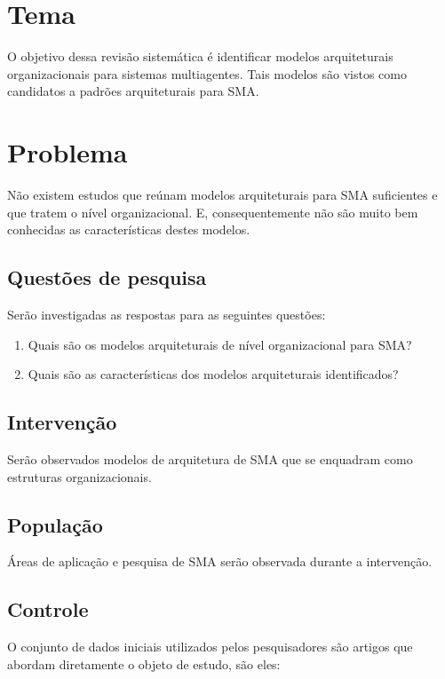 
\section{Tema}

O objetivo dessa revisão sistemática é identificar modelos arquiteturais organizacionais para sistemas multiagentes. Tais modelos são vistos como candidatos a padrões arquiteturais para SMA.

\section{Problema}

Não existem estudos que reúnam modelos arquiteturais para SMA suficientes e que tratem o nível organizacional. E, consequentemente não são muito bem conhecidas as características destes modelos.

\subsection{Questões de pesquisa}

Serão investigadas as respostas para as seguintes questões:

\begin{enumerate}
    \item Quais são os modelos arquiteturais de nível organizacional para SMA?
    \item Quais são as características dos modelos arquiteturais identificados?
\end{enumerate}


\subsection{Intervenção}
Serão observados modelos de arquitetura de SMA que se enquadram como estruturas organizacionais.

\subsection{População}
Áreas de aplicação e pesquisa de SMA serão observada durante a intervenção.

\subsection{Controle}
O conjunto de dados iniciais utilizados pelos pesquisadores são artigos que abordam diretamente o objeto de estudo, são eles:


